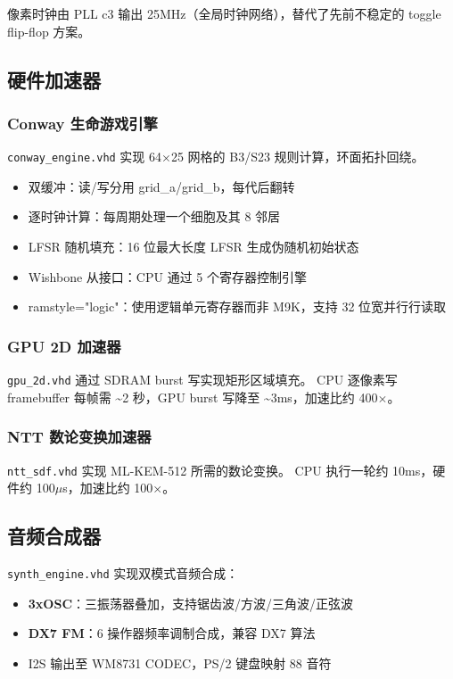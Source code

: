 \documentclass{SYSUReport}
\begin{document}
像素时钟由 PLL c3 输出 25MHz（全局时钟网络），替代了先前不稳定的 toggle flip-flop 方案。

\subsection{硬件加速器}

\subsubsection{Conway 生命游戏引擎}

\texttt{conway\_engine.vhd} 实现 64$\times$25 网格的 B3/S23 规则计算，环面拓扑回绕。

\begin{itemize}
    \item 双缓冲：读/写分用 grid\_a/grid\_b，每代后翻转
    \item 逐时钟计算：每周期处理一个细胞及其 8 邻居
    \item LFSR 随机填充：16 位最大长度 LFSR 生成伪随机初始状态
    \item Wishbone 从接口：CPU 通过 5 个寄存器控制引擎
    \item ramstyle="logic"：使用逻辑单元寄存器而非 M9K，支持 32 位宽并行行读取
\end{itemize}

\subsubsection{GPU 2D 加速器}

\texttt{gpu\_2d.vhd} 通过 SDRAM burst 写实现矩形区域填充。
CPU 逐像素写 framebuffer 每帧需 \textasciitilde{}2 秒，GPU burst 写降至 \textasciitilde{}3ms，加速比约 400$\times$。

\subsubsection{NTT 数论变换加速器}

\texttt{ntt\_sdf.vhd} 实现 ML-KEM-512 所需的数论变换。
CPU 执行一轮约 10ms，硬件约 100$\mu$s，加速比约 100$\times$。

\subsection{音频合成器}

\texttt{synth\_engine.vhd} 实现双模式音频合成：

\begin{itemize}
    \item \textbf{3xOSC}：三振荡器叠加，支持锯齿波/方波/三角波/正弦波
    \item \textbf{DX7 FM}：6 操作器频率调制合成，兼容 DX7 算法
    \item I2S 输出至 WM8731 CODEC，PS/2 键盘映射 88 音符
\end{itemize}
\end{document}

